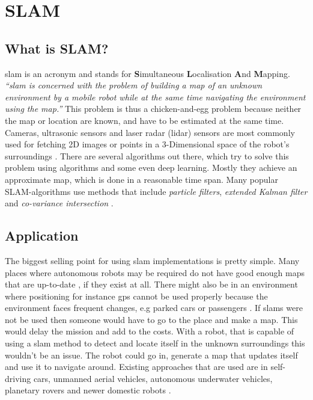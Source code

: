 
\chapter{SLAM\authorA}

\section{What is SLAM?}
\gls{slam} is an acronym and stands for \textbf{S}imultaneous \textbf{L}ocalisation \textbf{A}nd \textbf{M}apping.
\emph{\enquote{\gls{slam} is concerned with the problem of building a map of an unknown environment by a mobile robot while at the same time navigating the environment using the map.}} \cite{slamfordummies} \newline
This problem is thus a chicken-and-egg problem because neither the map or location are known, and have to be estimated at the same time. Cameras, ultrasonic sensors and laser radar (\gls{lidar}) sensors are most commonly used for fetching 2D images or points in a 3-Dimensional space of the robot's surroundings \cite{arreverie}. \newline
There are several algorithms out there, which try to solve this problem using algorithms and some even deep learning. Mostly they achieve an approximate map, which is done in a reasonable time span. Many popular SLAM-algorithms use methods that include \textit{particle filters}, \textit{extended Kalman filter} and \textit{co-variance intersection}\cite{slamfordummies} \cite{1678144}. \newline

\section{Application}
The biggest selling point for using \gls{slam} implementations is pretty simple. Many places where autonomous robots may be required do not have good enough maps that are up-to-date , if they exist at all. There might also be in an environment where positioning for instance \gls{gps} cannot be used properly because the environment faces frequent changes, e.g parked cars or passengers \cite{techapeekslam}.  If \gls{slam}s were not be used then someone would have to go to the place and make a map. This would delay the mission and add to the costs. \newline
With a robot, that is capable of using a \gls{slam} method to detect and locate itself in the unknown surroundings this wouldn't be an issue. The robot could go in, generate a map that updates itself and use it to navigate around. \newline
Existing approaches that are used are in self-driving cars, unmanned aerial vehicles, autonomous underwater vehicles, planetary rovers and newer domestic robots \cite{usescasesforslam}.

